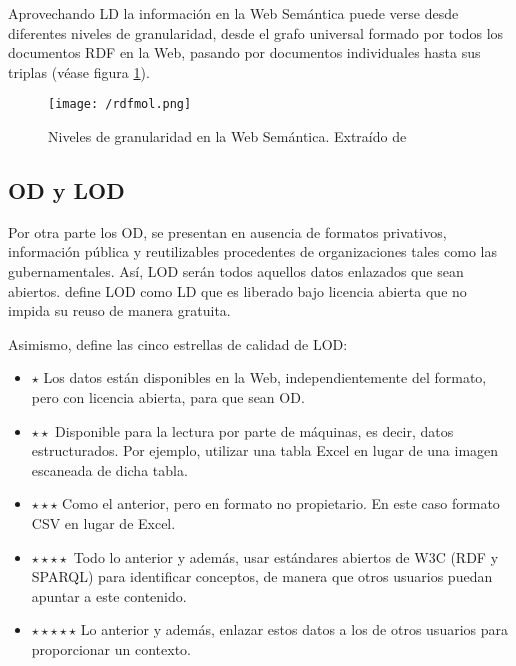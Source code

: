 Aprovechando \acs{LD} la información en la Web Semántica puede verse desde
diferentes niveles de granularidad, desde el grafo universal formado por todos
los documentos \acs{RDF} en la Web, pasando por documentos individuales hasta
sus triplas \cite{ding_tracking_2005} (véase figura \ref{fig:rdfmol}). 


\begin{figure}[!h]
  \begin{center}
    \texttt{[image: /rdfmol.png]} 
    \caption{Niveles de granularidad en la Web Semántica. Extraído de \cite{ding_tracking_2005}}
    \label{fig:rdfmol}
  \end{center}
\end{figure}


\subsection{\acf{OD} y \acf{LOD}}

Por otra parte los \acf{OD}, se presentan en ausencia de
formatos privativos, información pública y reutilizables procedentes de
organizaciones tales como las gubernamentales. Así, \acf{LOD} serán todos
aquellos datos enlazados que sean abiertos. \cite{bernerslee:2009} define
\acs{LOD} como \acs{LD} que es liberado bajo licencia abierta que no impida su
reuso de manera gratuita. 

Asimismo, define las cinco estrellas de calidad de \acs{LOD}: 

\begin{itemize}
\item \textbf{$\star$} Los datos están disponibles en la Web, independientemente del
  formato, pero con licencia abierta, para que sean \acs{OD}.
\item \textbf{$\star \star$} Disponible para la lectura por parte de máquinas, es decir,
  datos estructurados. Por ejemplo, utilizar una tabla Excel en lugar de una
  imagen escaneada de dicha tabla. 
\item \textbf{$\star \star \star$} Como el anterior, pero en formato no propietario. En
  este caso formato \acf{CSV} en lugar de Excel.
\item \textbf{$\star \star \star \star$} Todo lo anterior y además, usar estándares
  abiertos de \acs{W3C} (\acs{RDF} y \acs{SPARQL}) para identificar conceptos,
  de manera que otros usuarios puedan apuntar a este contenido. 
\item \textbf{$\star \star \star \star \star$} Lo anterior y además, enlazar estos datos
  a los de otros usuarios para proporcionar un contexto. 
\end{itemize}

